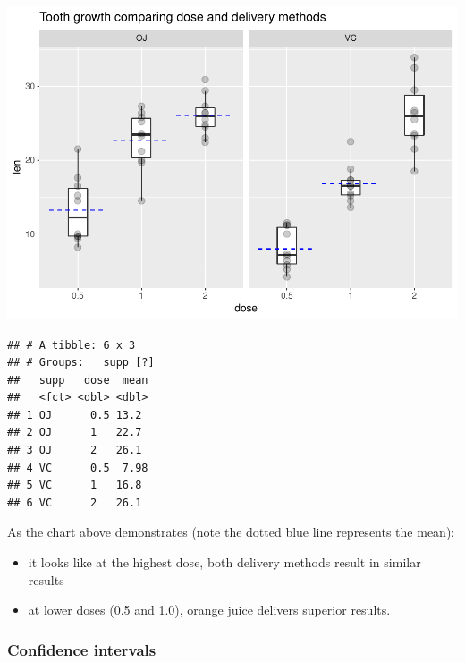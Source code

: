 \documentclass[]{article}
\newenvironment{Shaded}{\begin{snugshade}}{\end{snugshade}}
\newcommand{\CommentTok}[1]{\textcolor[rgb]{0.56,0.35,0.01}{\textit{#1}}}
\newcommand{\DataTypeTok}[1]{\textcolor[rgb]{0.13,0.29,0.53}{#1}}
\newcommand{\KeywordTok}[1]{\textcolor[rgb]{0.13,0.29,0.53}{\textbf{#1}}}
\newcommand{\NormalTok}[1]{#1}
\newcommand{\OperatorTok}[1]{\textcolor[rgb]{0.81,0.36,0.00}{\textbf{#1}}}
\newcommand{\StringTok}[1]{\textcolor[rgb]{0.31,0.60,0.02}{#1}}
\providecommand{\tightlist}{%
  \setlength{\itemsep}{0pt}\setlength{\parskip}{0pt}}
\begin{document}
\includegraphics{Assignment_Part_2_-_Basic_Inferential_Data_Analysis_v1.1_files/figure-latex/unnamed-chunk-4-1.pdf}

\begin{Shaded}
\end{Shaded}

\begin{verbatim}
## # A tibble: 6 x 3
## # Groups:   supp [?]
##   supp   dose  mean
##   <fct> <dbl> <dbl>
## 1 OJ      0.5 13.2 
## 2 OJ      1   22.7 
## 3 OJ      2   26.1 
## 4 VC      0.5  7.98
## 5 VC      1   16.8 
## 6 VC      2   26.1
\end{verbatim}

As the chart above demonstrates (note the dotted blue line represents
the mean):

\begin{itemize}
\tightlist
\item
  it looks like at the highest dose, both delivery methods result in
  similar results
\item
  at lower doses (0.5 and 1.0), orange juice delivers superior results.
\end{itemize}

\hypertarget{confidence-intervals}{%
\subsubsection{Confidence intervals}\label{confidence-intervals}}
\end{document}
